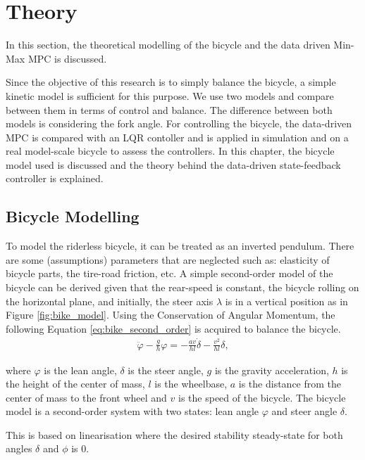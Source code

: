 \chapter{Theory}
\label{chap:theory}
In this section, the theoretical modelling of the bicycle and the data driven Min-Max MPC is discussed.

Since the objective of this research is to simply balance the bicycle, a simple kinetic model is sufficient for this purpose. We use two models and compare between them in terms of control and balance.
The difference between both models is considering the fork angle.
For controlling the bicycle, the data-driven MPC is compared with an LQR contoller and is applied in simulation and on a real model-scale bicycle to assess the controllers. In this chapter, the bicycle model used is discussed and the theory behind the data-driven state-feedback controller is explained.

\section{Bicycle Modelling}
\label{sec:bike_modelling}

	To model the riderless bicycle, it can be treated as an inverted pendulum. There are some (assumptions) parameters that are neglected such as: elasticity of bicycle parts, the tire-road friction, etc. A simple second-order model of the bicycle can be derived given that the rear-speed is constant, the bicycle rolling on the horizontal plane, and initially, the steer axis $\lambda$ is in a vertical position as in Figure \ref{fig:bike_model}. Using the Conservation of Angular Momentum, the following Equation \ref{eq:bike_second_order} is acquired to balance the bicycle.
	\begin{align*}
		\label{eq:bike_second_order}
		\ddot{\varphi} - \frac{g}{h} \varphi = - \frac{av}{hl} \dot{\delta} - \frac{v^2}{h l} \delta,
	\end{align*}

	where $\varphi$ is the lean angle, $\delta$ is the steer angle, $g$ is the gravity acceleration, $h$ is the height of the center of mass, $l$ is the wheelbase, $a$ is the distance from the center of mass to the front wheel and $v$ is the speed of the bicycle. The bicycle model is a second-order system with two states: lean angle $\varphi$ and steer angle $\delta$.

	This is based on linearisation where the desired stability steady-state for both angles $\delta$ and $\phi$ is 0.

